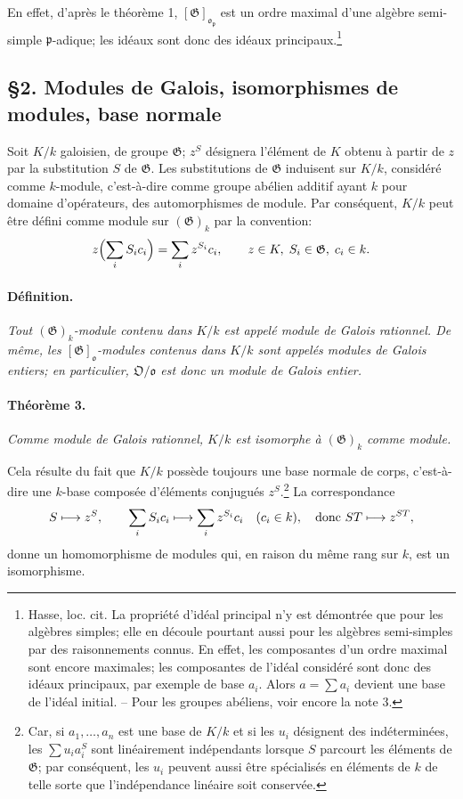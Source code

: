 En effet, d'après le théorème 1, \([\mathfrak{G}]_{\mathfrak{o}_{\mathfrak{p}}}\) est un ordre maximal d'une algèbre semi-simple \(\mathfrak{p}\)-adique; les idéaux sont donc des idéaux principaux.\footnote{Hasse, loc. cit. La propriété d'idéal principal n'y est démontrée que pour les algèbres simples; elle en découle pourtant aussi pour les algèbres semi-simples par des raisonnements connus. En effet, les composantes d'un ordre maximal sont encore maximales; les composantes de l'idéal considéré sont donc des idéaux principaux, par exemple de base \(a_i\). Alors \(a=\sum a_i\) devient une base de l'idéal initial. -- Pour les groupes abéliens, voir encore la note 3.}

\subsection*{\S2. Modules de Galois, isomorphismes de modules, base normale}

Soit \(K/k\) galoisien, de groupe \(\mathfrak{G}\); \(z^S\) désignera l'élément de \(K\) obtenu à partir de \(z\) par la substitution \(S\) de \(\mathfrak{G}\). Les substitutions de \(\mathfrak{G}\) induisent sur \(K/k\), considéré comme \(k\)-module, c'est-à-dire comme groupe abélien additif ayant \(k\) pour domaine d'opérateurs, des automorphismes de module. Par conséquent, \(K/k\) peut être défini comme module sur \((\mathfrak{G})_k\) par la convention:
\[
        z\Bigl(\sum_i S_i c_i\Bigr)=\sum_i z^{S_i}c_i,
        \qquad z\in K,\; S_i\in\mathfrak{G},\; c_i\in k.
\]

\paragraph{Définition.}
\emph{Tout \((\mathfrak{G})_k\)-module contenu dans \(K/k\) est appelé module de Galois rationnel. De même, les \([\mathfrak{G}]_{\mathfrak{o}}\)-modules contenus dans \(K/k\) sont appelés modules de Galois entiers; en particulier, \(\mathfrak{O}/\mathfrak{o}\) est donc un module de Galois entier.}

\paragraph{Théorème 3.}
\emph{Comme module de Galois rationnel, \(K/k\) est isomorphe à \((\mathfrak{G})_k\) comme module.}

Cela résulte du fait que \(K/k\) possède toujours une base normale de corps, c'est-à-dire une \(k\)-base composée d'éléments conjugués \(z^S\).\footnote{Car, si \(a_1,\ldots,a_n\) est une base de \(K/k\) et si les \(u_i\) désignent des indéterminées, les \(\sum u_i a_i^S\) sont linéairement indépendants lorsque \(S\) parcourt les éléments de \(\mathfrak{G}\); par conséquent, les \(u_i\) peuvent aussi être spécialisés en éléments de \(k\) de telle sorte que l'indépendance linéaire soit conservée.} La correspondance
\[
        S\longmapsto z^S,
        \qquad
        \sum_i S_i c_i\longmapsto \sum_i z^{S_i}c_i
        \quad(c_i\in k),
        \quad\hbox{donc } ST\longmapsto z^{ST},
\]
donne un homomorphisme de modules qui, en raison du même rang sur \(k\), est un isomorphisme.

